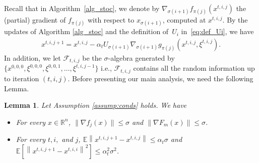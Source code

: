 \documentclass[11pt,a4paper]{article}
\numberwithin{equation}{section}%
\newtheorem{lemma}[theorem]{Lemma}
\renewcommand{\(}{\left (}
\renewcommand{\)}{\right )}
\newcommand{\Fm}{F_m}
\begin{document}
Recall that in Algorithm~\ref{alg_stoc}, we denote by  $\nabla_{\sigma(i+1)} f_{\pi(j)} (x^{t,i,j})$ the (partial) gradient of $f_{\pi(j)}$ with respect to $x_{\sigma(i+1)}$, computed at $x^{t,i,j}$. By the updates of Algorithm \ref{alg_stoc} and the definition of~$U_i$ in~\eqref{eq:def_Ui}, we have 
\begin{align}\label{eq:alg_update}
    x^{t,i,j+1} = x^{t,i,j} - \alpha_t U_{\sigma(i+1)} \nabla_{\sigma(i+1)} g_{\pi(j)} (x^{t,i,j}, \xi^{t,i,j}).
\end{align}
In addition, we let $\mathcal{F}_{t,i,j}$ be the $\sigma$-algebra generated by $\{x^{0,0,0}, \xi^{0,0,0}, \xi^{0,0,1}, \dots, \xi^{t,i,j-1}\}$ i.e., $\mathcal{F}_{t,i,j}$ contains all the random information up to iteration $(t,i,j)$. Before presenting our main analysis, we need the following Lemma. 
\begin{lemma}\label{lem:bounds}
Let Assumption \ref{assump:conds} holds. 
We have 
\begin{itemize}
\item[(a)] For every $x\in \mathbb{R}^n$, $\|\nabla f_j(x)\| \leq \sigma$ and $\|\nabla \Fm(x)\| \leq \sigma$.
\item[(b)] For every $t, i,$ and $j$, $\mathbb{E} \left\|x^{t,i,j+1}-x^{t,i,j}\right\| \leq \alpha_t \sigma $ and $\mathbb{E} \left[\left\|x^{t,i,j+1}-x^{t,i,i}\right\|^2\right] \leq \alpha^2_t \sigma^2$.
\end{itemize} 
\end{lemma}
\end{document}
